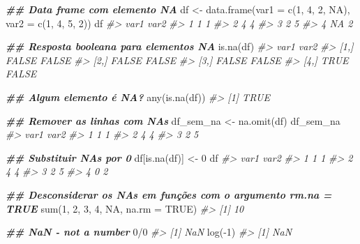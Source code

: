 \documentclass[
]{book}
\newenvironment{Shaded}{\begin{snugshade}}{\end{snugshade}}
\newcommand{\AttributeTok}[1]{\textcolor[rgb]{0.61,0.61,0.61}{#1}}
\newcommand{\CommentTok}[1]{\textcolor[rgb]{0.37,0.37,0.37}{\textit{#1}}}
\newcommand{\ConstantTok}[1]{\textcolor[rgb]{0,0,0}{#1}}
\newcommand{\DecValTok}[1]{\textcolor[rgb]{0.06,0.06,0.06}{#1}}
\newcommand{\DocumentationTok}[1]{\textcolor[rgb]{0.37,0.37,0.37}{\textbf{\textit{#1}}}}
\newcommand{\FunctionTok}[1]{\textcolor[rgb]{0,0,0}{#1}}
\newcommand{\NormalTok}[1]{#1}
\newcommand{\OtherTok}[1]{\textcolor[rgb]{0.37,0.37,0.37}{#1}}
\newcommand{\SpecialCharTok}[1]{\textcolor[rgb]{0,0,0}{#1}}
\begin{document}
\begin{Shaded}
\begin{Highlighting}[]
\DocumentationTok{\#\# Data frame com elemento NA}
\NormalTok{df }\OtherTok{\textless{}{-}} \FunctionTok{data.frame}\NormalTok{(}\AttributeTok{var1 =} \FunctionTok{c}\NormalTok{(}\DecValTok{1}\NormalTok{, }\DecValTok{4}\NormalTok{, }\DecValTok{2}\NormalTok{, }\ConstantTok{NA}\NormalTok{), }\AttributeTok{var2 =} \FunctionTok{c}\NormalTok{(}\DecValTok{1}\NormalTok{, }\DecValTok{4}\NormalTok{, }\DecValTok{5}\NormalTok{, }\DecValTok{2}\NormalTok{))}
\NormalTok{df}
\CommentTok{\#\textgreater{}   var1 var2}
\CommentTok{\#\textgreater{} 1    1    1}
\CommentTok{\#\textgreater{} 2    4    4}
\CommentTok{\#\textgreater{} 3    2    5}
\CommentTok{\#\textgreater{} 4   NA    2}

\DocumentationTok{\#\# Resposta booleana para elementos NA}
\FunctionTok{is.na}\NormalTok{(df)}
\CommentTok{\#\textgreater{}       var1  var2}
\CommentTok{\#\textgreater{} [1,] FALSE FALSE}
\CommentTok{\#\textgreater{} [2,] FALSE FALSE}
\CommentTok{\#\textgreater{} [3,] FALSE FALSE}
\CommentTok{\#\textgreater{} [4,]  TRUE FALSE}

\DocumentationTok{\#\# Algum elemento é NA?}
\FunctionTok{any}\NormalTok{(}\FunctionTok{is.na}\NormalTok{(df))}
\CommentTok{\#\textgreater{} [1] TRUE}

\DocumentationTok{\#\# Remover as linhas com NAs}
\NormalTok{df\_sem\_na }\OtherTok{\textless{}{-}} \FunctionTok{na.omit}\NormalTok{(df)}
\NormalTok{df\_sem\_na}
\CommentTok{\#\textgreater{}   var1 var2}
\CommentTok{\#\textgreater{} 1    1    1}
\CommentTok{\#\textgreater{} 2    4    4}
\CommentTok{\#\textgreater{} 3    2    5}

\DocumentationTok{\#\# Substituir NAs por 0}
\NormalTok{df[}\FunctionTok{is.na}\NormalTok{(df)] }\OtherTok{\textless{}{-}} \DecValTok{0}
\NormalTok{df}
\CommentTok{\#\textgreater{}   var1 var2}
\CommentTok{\#\textgreater{} 1    1    1}
\CommentTok{\#\textgreater{} 2    4    4}
\CommentTok{\#\textgreater{} 3    2    5}
\CommentTok{\#\textgreater{} 4    0    2}

\DocumentationTok{\#\# Desconsiderar os NAs em funções com o argumento rm.na = TRUE}
\FunctionTok{sum}\NormalTok{(}\DecValTok{1}\NormalTok{, }\DecValTok{2}\NormalTok{, }\DecValTok{3}\NormalTok{, }\DecValTok{4}\NormalTok{, }\ConstantTok{NA}\NormalTok{, }\AttributeTok{na.rm =} \ConstantTok{TRUE}\NormalTok{)}
\CommentTok{\#\textgreater{} [1] 10}

\DocumentationTok{\#\# NaN {-} not a number}
\DecValTok{0}\SpecialCharTok{/}\DecValTok{0}
\CommentTok{\#\textgreater{} [1] NaN}
\FunctionTok{log}\NormalTok{(}\SpecialCharTok{{-}}\DecValTok{1}\NormalTok{)}
\CommentTok{\#\textgreater{} [1] NaN}


\end{Highlighting}
\end{Shaded}
\end{document}
